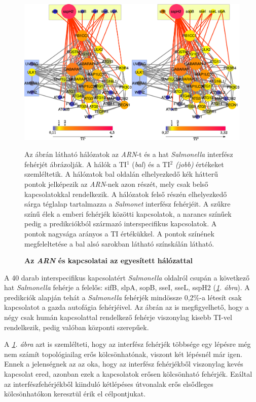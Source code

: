 \documentclass[a4paper,12pt]{article}
\newenvironment{imgdesc}{
		\small
		\singlespacing
		\begin{center}
		
	}{
		\end{center}	
	}
\begin{document}
				\begin{figure}[H]
					\includegraphics[scale=0.4]{img/connection_prots_v2_complete.pdf}
					\centering
					\caption{ \textbf{Az \textit{ARN} és kapcsolatai az egyesített hálózattal}}		
					\label{fig:connection}
					\begin{imgdesc}
					Az ábrán látható hálózatok az \textit{ARN}-t és a hat \textit{Salmonella} interfész fehérjét ábrázolják. A hálók a TI$^1$ (\textit{bal}) és a TI$^2$ \textit{(jobb)} értékeket szemléltetik. A hálózatok bal oldalán elhelyezkedő kék hátterű pontok jelképezik az \textit{ARN}-nek azon részét, mely csak belső kapcsolatokkal rendelkezik. A hálózatok felső részén elhelyezkedő sárga téglalap tartalmazza a \textit{Salmonet} interfész fehérjéit. A szűkre színű élek a emberi fehérjék közötti kapcsolatok, a narancs színűek pedig a predikciókból származó interspecifikus kapcsolatok. A pontok nagysága arányos a TI értékükkel. A pontok színének megfeleltetése a bal alsó sarokban látható színskálán látható. 
					\end{imgdesc}			 		 
				\end{figure}

				
		 A 40 darab interspecifikus kapcsolatért \textit{Salmonella} oldalról csupán a következő hat \textit{Salmonella} fehérje a felelős: sifB, slpA, sopB, sseI, sseL, sspH2 (\textit{\ref{fig:connection}. ábra}). A predikciók alapján tehát a \textit{Salmonella} fehérjék mindössze 0,2\%-a létesít csak kapcsolatot a gazda autofágia fehérjéivel. Az ábrán az is megfigyelhető, hogy a négy csak humán kapcsolattal rendelkező fehérje viszonylag kisebb TI-vel rendelkezik, pedig valóban központi szerepűek.
		 
		 A \textit{\ref{fig:connection}. ábra} azt is szemlélteti, hogy az interfész fehérjék többsége egy lépésre még nem számít topológiailag erős kölcsönhatónak, viszont két lépésnél már igen. Ennek a jelenségnek az az oka, hogy az interfész fehérjékből viszonylag kevés kapcsolat ered, azonban ezek a kapcsolatok erősen kölcsönható fehérjék. Ezáltal az interfészfehérjékből kiinduló kétlépéses útvonalak erős elsődleges kölcsönhatókon keresztül érik el célpontjukat.
		
\end{document}
